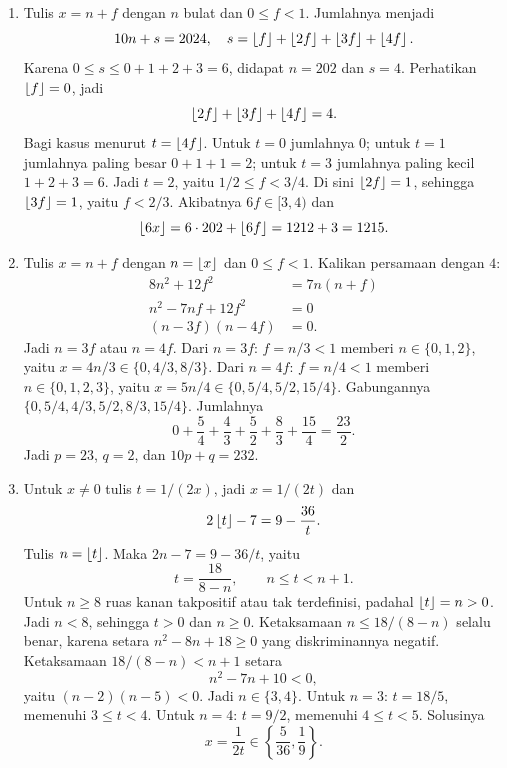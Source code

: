 \documentclass[12pt]{scrartcl}
\begin{document}
\begin{enumerate}[resume]
	\item Tulis $x = n + f$ dengan $n$ bulat dan $0 \le f < 1$.
	Jumlahnya menjadi
	\[ 10n + s = 2024,
	\quad s = \left\lfloor f \right\rfloor + \left\lfloor 2f \right\rfloor + \left\lfloor 3f \right\rfloor + \left\lfloor 4f \right\rfloor. \]
	Karena $0 \le s \le 0 + 1 + 2 + 3 = 6$,
	didapat $n = 202$ dan $s = 4$.
	Perhatikan $\left\lfloor f \right\rfloor = 0$, jadi
	\[ \left\lfloor 2f \right\rfloor + \left\lfloor 3f \right\rfloor + \left\lfloor 4f \right\rfloor = 4. \]
	Bagi kasus menurut $t = \left\lfloor 4f \right\rfloor$.
	Untuk $t = 0$ jumlahnya $0$;
	untuk $t = 1$ jumlahnya paling besar $0 + 1 + 1 = 2$;
	untuk $t = 3$ jumlahnya paling kecil $1 + 2 + 3 = 6$.
	Jadi $t = 2$, yaitu $1/2 \le f < 3/4$.
	Di sini $\left\lfloor 2f \right\rfloor = 1$, sehingga $\left\lfloor 3f \right\rfloor = 1$,
	yaitu $f < 2/3$. Akibatnya $6f \in [3, 4)$ dan
	\[ \left\lfloor 6x \right\rfloor = 6 \cdot 202 + \left\lfloor 6f \right\rfloor = 1212 + 3 = 1215. \]

	\item Tulis $x = n + f$ dengan $n = \left\lfloor x \right\rfloor$
	dan $0 \le f < 1$. Kalikan persamaan dengan $4$:
	\begin{align*}
	8n^2 + 12f^2 &= 7n(n + f) \\
	n^2 - 7nf + 12f^2 &= 0 \\
	(n - 3f)(n - 4f) &= 0.
	\end{align*}
	Jadi $n = 3f$ atau $n = 4f$.
	Dari $n = 3f$: $f = n/3 < 1$ memberi $n \in \{0, 1, 2\}$,
	yaitu $x = 4n/3 \in \{0, 4/3, 8/3\}$.
	Dari $n = 4f$: $f = n/4 < 1$ memberi $n \in \{0, 1, 2, 3\}$,
	yaitu $x = 5n/4 \in \{0, 5/4, 5/2, 15/4\}$.
	Gabungannya $\{0, 5/4, 4/3, 5/2, 8/3, 15/4\}$.
	Jumlahnya
	\[ 0 + \frac{5}{4} + \frac{4}{3} + \frac{5}{2}
	+ \frac{8}{3} + \frac{15}{4} = \frac{23}{2}. \]
	Jadi $p = 23$, $q = 2$, dan $10p + q = 232$.

	\item Untuk $x \ne 0$ tulis $t = 1/(2x)$,
	jadi $x = 1/(2t)$ dan
	\[ 2\left\lfloor t \right\rfloor - 7 = 9 - \frac{36}{t}. \]
	Tulis $n = \left\lfloor t \right\rfloor$. Maka $2n - 7 = 9 - 36/t$, yaitu
	\[ t = \frac{18}{8-n}, \qquad n \le t < n + 1. \]
	Untuk $n \ge 8$ ruas kanan takpositif atau tak terdefinisi,
	padahal $\left\lfloor t \right\rfloor = n > 0$. Jadi $n < 8$,
	sehingga $t > 0$ dan $n \ge 0$.
	Ketaksamaan $n \le 18/(8-n)$ selalu benar,
	karena setara $n^2 - 8n + 18 \ge 0$ yang diskriminannya negatif.
	Ketaksamaan $18/(8-n) < n+1$ setara
	\[ n^2 - 7n + 10 < 0, \]
	yaitu $(n-2)(n-5) < 0$. Jadi $n \in \{3, 4\}$.
	Untuk $n = 3$: $t = 18/5$, memenuhi $3 \le t < 4$.
	Untuk $n = 4$: $t = 9/2$, memenuhi $4 \le t < 5$.
	Solusinya
	\[ x = \frac{1}{2t} \in \left\{\frac{5}{36}, \frac{1}{9}\right\}. \]

\end{enumerate}
\end{document}
